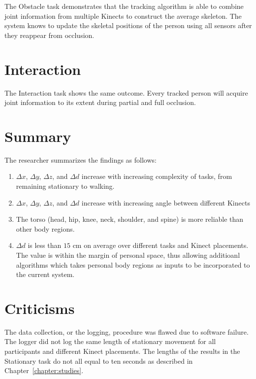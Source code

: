 The Obstacle task demonstrates that the tracking algorithm is able to combine joint information from multiple Kinects to construct the average skeleton. The system knows to update the skeletal positions of the person using all sensors after they reappear from occlusion.

\section{Interaction}
\label{sec:discussion_interaction}

The Interaction task shows the same outcome. Every tracked person will acquire joint information to its extent during partial and full occlusion.

\section{Summary}

The researcher summarizes the findings as follows:

\begin{enumerate}
  \item $\Delta x$, $\Delta y$, $\Delta z$, and $\Delta d$ increase with increasing complexity of tasks, from remaining stationary to walking.
  \item $\Delta x$, $\Delta y$, $\Delta z$, and $\Delta d$ increase with increasing angle between different Kinects
  \item The torso (head, hip, knee, neck, shoulder, and spine) is more reliable than other body regions.
  \item $\Delta d$ is less than $15$ cm on average over different tasks and Kinect placements. The value is within the margin of personal space, thus allowing additioanl algorithms which takes personal body regions as inputs to be incorporated to the current system.
\end{enumerate}

\section{Criticisms}
\label{sec:discussion_criticisms}

The data collection, or the logging, procedure was flawed due to software failure. The logger did not log the same length of stationary movement for all participants and different Kinect placements. The lengths of the results in the Stationary task do not all equal to ten seconds as described in Chapter~\ref{chapter:studies}.


